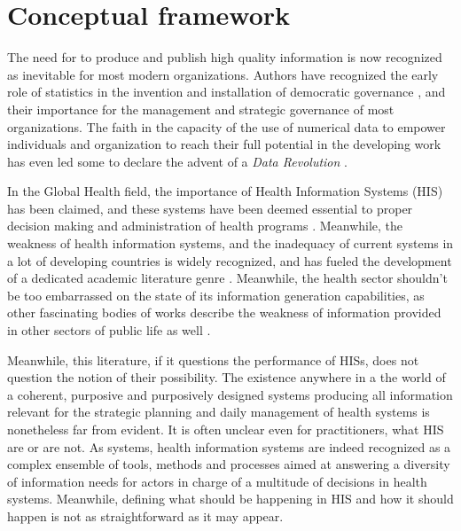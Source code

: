 \section{Conceptual framework}

The need for to produce and publish high quality information is now recognized as inevitable for most modern organizations. Authors have recognized the early role of statistics in the invention and installation of democratic governance \cite{porter_trust_1996}, and their importance for the management and strategic governance of most organizations. The faith in the capacity of the use of numerical data to empower individuals and organization to reach their full potential in the developing work has even led some to declare the advent of a \textit{Data Revolution}\cite{independent_expert_group_on_a_data_revolution_for_sustainable_development_world_2014} \cite{center_for_global_development_delivering_2014}.

In the Global Health field, the importance of Health Information Systems (HIS) has been claimed, and these systems have been deemed essential to proper decision making and administration of health programs \cite{abou-zahr_health_2005}. Meanwhile, the weakness of health information systems, and the inadequacy of current systems in a lot of  developing countries is widely recognized, and has fueled the development of a dedicated academic literature genre \cite{abou-zahr_better_2010} \cite{kiberu_strengthening_2014}. Meanwhile, the health sector shouldn't be too embarrassed on the state of its information generation capabilities, as other fascinating bodies of works describe the weakness of information provided in other sectors of public life as well \cite{jerven_poor_2013}.

Meanwhile, this literature, if it questions the performance of HISs, does not question the notion of their possibility. The existence anywhere in a the world of a coherent, purposive and purposively designed systems producing all information relevant for the strategic planning and daily management of health systems is nonetheless far from evident. It is often unclear even for practitioners, what HIS are or are not. As systems, health information systems are indeed recognized as a complex ensemble of tools, methods and processes aimed at answering a diversity of information needs for actors in charge of a multitude of decisions in health systems. Meanwhile, defining what should be happening in HIS and how it should happen is not as straightforward as it may appear.


